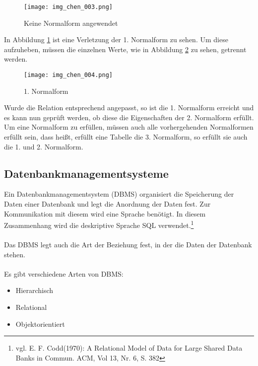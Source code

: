\begin{figure}[H]
\begin{center}
\texttt{[image: img\_chen\_003.png]}
\caption{Keine Normalform angewendet}
\label{chenpic4}
\end{center}
\end{figure}



In Abbildung \ref{chenpic4} ist eine Verletzung der 1. Normalform zu sehen. Um diese aufzuheben, müssen die einzelnen Werte, wie in Abbildung \ref{chenpic5} zu sehen, getrennt werden.

\begin{figure}[H]
\begin{center}
\texttt{[image: img\_chen\_004.png]}
\caption{1. Normalform}
\label{chenpic5}
\end{center}
\end{figure}

Wurde die Relation entsprechend angepasst, so ist die 1. Normalform erreicht und es kann nun geprüft werden,
ob diese die Eigenschaften der 2. Normalform erfüllt.
Um eine Normalform zu erfüllen, müssen auch alle vorhergehenden Normalformen erfüllt sein, dass heißt, erfüllt eine Tabelle die 3. Normalform, so erfüllt sie auch die 1. und 2. Normalform.


\subsection{Datenbankmanagementsysteme}
\label{sec:dbms}

Ein Datenbankmanagementsystem (DBMS) organisiert die Speicherung der Daten einer Datenbank und legt die Anordnung der Daten fest.
Zur Kommunikation mit diesem wird eine Sprache benötigt. In diesem Zusammenhang wird die deskriptive Sprache SQL verwendet.\footnote{vgl. E. F. Codd(1970): A Relational Model of Data for Large Shared Data Banks in Commun. ACM, Vol 13, Nr. 6, S. 382}\\\\
Das DBMS legt auch die Art der Beziehung fest, in der die Daten der Datenbank stehen.\\\\
Es gibt verschiedene Arten von DBMS:

\begin{itemize}
\item Hierarchisch
\item Relational
\item Objektorientiert
\end{itemize}

